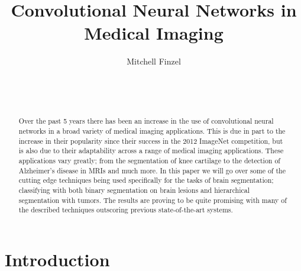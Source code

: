 \documentclass{sig-alternate}
\begin{document}

\title{Convolutional Neural Networks in Medical Imaging}


\author{
\alignauthor
Mitchell Finzel\\
	\\
	\\
	\\
}

\maketitle
\begin{abstract}
Over the past 5 years there has been an increase in the use of convolutional neural networks in a broad variety of medical imaging applications. This is due in part to the increase in their popularity since their success in the 2012 ImageNet competition, but is also due to their adaptability across a range of medical imaging applications. These applications vary greatly; from the segmentation of knee cartilage to the detection of Alzheimer's disease in MRIs and much more. In this paper we will go over some of the cutting edge techniques being used specifically for the tasks of brain segmentation; classifying with both binary segmentation on brain lesions and hierarchical segmentation with tumors. The results are proving to be quite promising with many of the described techniques outscoring previous state-of-the-art systems.

\end{abstract}


\section{Introduction}
\label{sec:introduction}
\end{document}
